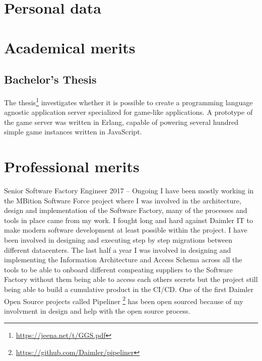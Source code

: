 \documentclass{twocolcv}
\begin{document}
\section*{Personal data}
  
\section*{Academical merits}

\subsection*{Bachelor's Thesis}
The thesis\footnote{\url{https://jeena.net/t/GGS.pdf}} investigates whether it is possible to create a programming language agnostic application server specialized for game-like applications. A prototype of the game server was written in Erlang, capable of powering several hundred simple game instances written in JavaScript.
  
\section*{Professional merits}

           {Senior Software Factory Engineer}
           {2017 -- Ongoing}
           {
             {I have been mostly working in the MBition Software Force project where I was involved in the architecture, design and implementation of the Software Factory, many of the processes and tools in place came from my work.\newline}
             {I fought long and hard against Daimler IT to make modern software development at least possible within the project. I have been involved in designing and executing step by step migrations between different datacenters.\newline}
             {The last half a year I was involved in designing and implementing the Information Architecture and Access Schema across all the tools to be able to onboard different compeating suppliers to the Software Factory without them being able to access each others secrets but the project still being able to build a cumulative product in the CI/CD.\newline}
             {One of the first Daimler Open Source projects called Pipeliner \footnote{\url{https://github.com/Daimler/pipeliner}} has been open sourced because of my involvment in design and help with the open source process.}
           }
\end{document}
